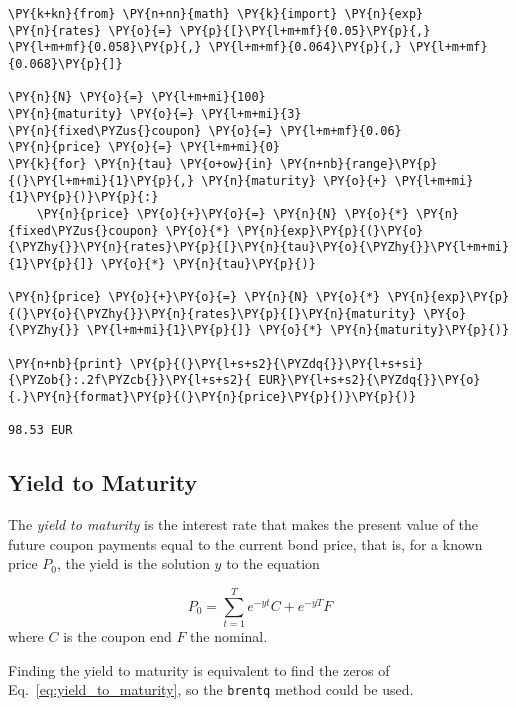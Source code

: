 \begin{codebox}
\begin{Verbatim}[commandchars=\\\{\}]
\PY{k+kn}{from} \PY{n+nn}{math} \PY{k}{import} \PY{n}{exp}
\PY{n}{rates} \PY{o}{=} \PY{p}{[}\PY{l+m+mf}{0.05}\PY{p}{,} \PY{l+m+mf}{0.058}\PY{p}{,} \PY{l+m+mf}{0.064}\PY{p}{,} \PY{l+m+mf}{0.068}\PY{p}{]}

\PY{n}{N} \PY{o}{=} \PY{l+m+mi}{100}
\PY{n}{maturity} \PY{o}{=} \PY{l+m+mi}{3}
\PY{n}{fixed\PYZus{}coupon} \PY{o}{=} \PY{l+m+mf}{0.06}
\PY{n}{price} \PY{o}{=} \PY{l+m+mi}{0}
\PY{k}{for} \PY{n}{tau} \PY{o+ow}{in} \PY{n+nb}{range}\PY{p}{(}\PY{l+m+mi}{1}\PY{p}{,} \PY{n}{maturity} \PY{o}{+} \PY{l+m+mi}{1}\PY{p}{)}\PY{p}{:}
    \PY{n}{price} \PY{o}{+}\PY{o}{=} \PY{n}{N} \PY{o}{*} \PY{n}{fixed\PYZus{}coupon} \PY{o}{*} \PY{n}{exp}\PY{p}{(}\PY{o}{\PYZhy{}}\PY{n}{rates}\PY{p}{[}\PY{n}{tau}\PY{o}{\PYZhy{}}\PY{l+m+mi}{1}\PY{p}{]} \PY{o}{*} \PY{n}{tau}\PY{p}{)}

\PY{n}{price} \PY{o}{+}\PY{o}{=} \PY{n}{N} \PY{o}{*} \PY{n}{exp}\PY{p}{(}\PY{o}{\PYZhy{}}\PY{n}{rates}\PY{p}{[}\PY{n}{maturity} \PY{o}{\PYZhy{}} \PY{l+m+mi}{1}\PY{p}{]} \PY{o}{*} \PY{n}{maturity}\PY{p}{)}
    
\PY{n+nb}{print} \PY{p}{(}\PY{l+s+s2}{\PYZdq{}}\PY{l+s+si}{\PYZob{}:.2f\PYZcb{}}\PY{l+s+s2}{ EUR}\PY{l+s+s2}{\PYZdq{}}\PY{o}{.}\PY{n}{format}\PY{p}{(}\PY{n}{price}\PY{p}{)}\PY{p}{)}

98.53 EUR
\end{Verbatim}
\end{codebox}

\subsection{Yield to Maturity}
The \emph{yield to maturity} is the interest rate that makes the present value of the future coupon payments equal to the current bond price, that is, for a known price $P_0$, the yield is the solution $y$ to the equation

\begin{equation}
	P_0 = \sum_{t=1}^T e^{-yt}C + e^{-yT}F 
\label{eq:yield_to_maturity}
\end{equation}
where $C$ is the coupon end $F$ the nominal.

Finding the yield to maturity is equivalent to find the zeros of Eq.~\ref{eq:yield_to_maturity}, so the \texttt{brentq} method could be used.


